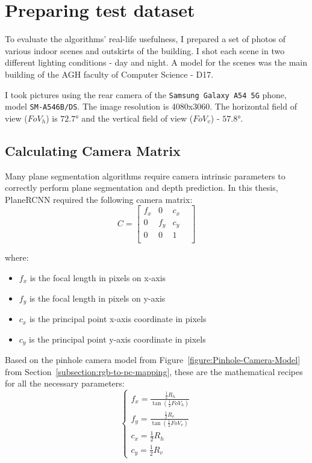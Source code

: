 \section{Preparing test dataset}

To evaluate the algorithms' real-life usefulness,
I prepared a set of photos of various indoor scenes and outskirts of the building.
I shot each scene in two different lighting conditions - day and night.
A model for the scenes was the main building of the AGH faculty of Computer Science - D17.

\par

I took pictures using the rear camera of the \texttt{Samsung Galaxy A54 5G} phone, model \texttt{SM-A546B/DS}.
The image resolution is 4080x3060.
The horizontal field of view ($FoV_h$) is $\ang{72.7}$
and the vertical field of view ($FoV_v$) - $\ang{57.8}$. \cite{camera-fv-5-samsung-a54}

\subsection{Calculating Camera Matrix}

Many plane segmentation algorithms require camera intrinsic parameters
to correctly perform plane segmentation and depth prediction.
In this thesis, PlaneRCNN required the following camera matrix:
\begin{equation} \label{eq:camera-matrix}
	C = \begin{bmatrix}
		f_x &   0 & c_x & \\
		  0 & f_y & c_y & \\
		  0 &   0 &   1 & \\
	\end{bmatrix}
\end{equation}

where:
\begin{itemize}
\item $f_x$ is the focal length in pixels on x-axis
\item $f_y$ is the focal length in pixels on y-axis
\item $c_x$ is the principal point x-axis coordinate in pixels
\item $c_y$ is the principal point y-axis coordinate in pixels
\end{itemize}

Based on the pinhole camera model from Figure~\ref{figure:Pinhole-Camera-Model}
from Section~\ref{subsection:rgb-to-pc-mapping},
these are the mathematical recipes for all the necessary parameters:
\begin{equation} \label{eq:camera-intrinsic-parameters}
\begin{cases}
  f_x = \frac{\frac{1}{2}R_h}{\tan(\frac{1}{2}FoV_h)} \\
  f_y = \frac{\frac{1}{2}R_v}{\tan(\frac{1}{2}FoV_v)} \\
  c_x = \frac{1}{2}R_h \\
  c_y = \frac{1}{2}R_v
\end{cases}
\end{equation}

